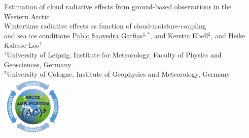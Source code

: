\documentclass[portrate,paperwidth=841mm,paperheight=1189mm,fontscale=0.4,margin=1cm]{baposter}
\begin{document}
\begin{poster}
{      %
  }
  {\color{black}Estimation of cloud radiative effects from ground-based observations in the Western Arctic\\
  {\vspace{0.35em}\LARGE Wintertime radiative effects as function of cloud-moisture-coupling\\ and sea ice conditions}}
  {\vspace{+0.9em} \underline{Pablo Saavedra Garfias}$^{1,*}$, and Kerstin Ebell$^{2}$, and Heike Kalesse-Los$^1$\\
    $^1$University of Leipzig, Institute for Meteorology, Faculty of Physics and Geosciences, Germany\\
	$^2$University of Cologne, Institute of Geophysics and Meteorology, Germany
    }
  {%
      \includegraphics[height=8.0em]{logo_small-ac3.png}
  }

    \newcommand{\colouredcircle}{%
      \vspace{1em}\tikz{\useasboundingbox (-0.2em,-0.32em) rectangle(0.2em,0.32em); \draw[draw=black,fill=lightblue,line width=0.03em] (0,0) circle(0.28em);}\hspace{0.8em}}


\end{poster}
\end{document}
